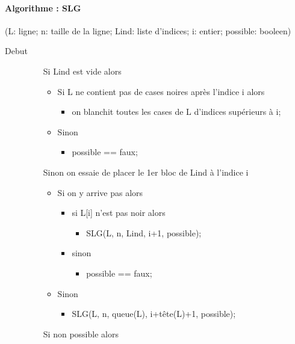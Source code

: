 \documentclass{article}
\begin{document}
\paragraph{Algorithme : SLG}(L: ligne; n: taille de la ligne; Lind: liste d'indices; i: entier; possible: booleen)
\begin{description}
\item[Debut]
\item[]
  \begin{itemize}
  \item[Si] Lind est vide alors 
    \begin{itemize}
    \item Si L ne contient pas de cases noires après l'indice i alors
      \begin{itemize}
      \item on blanchit toutes les cases de L d'indices supérieurs à i;
      \end{itemize}
    \item Sinon 
      \begin{itemize}
      \item possible == faux;
      \end{itemize}
    \end{itemize}
  \item[Sinon] on essaie de placer le 1er bloc de Lind à l'indice i
    \begin{itemize}
    \item Si on y arrive pas alors
      \begin{itemize}
      \item si L[i] n'est pas noir alors 
        \begin{itemize}
        \item SLG(L, n, Lind, i+1, possible);
        \end{itemize}
      \item sinon 
        \begin{itemize}
        \item possible == faux;
        \end{itemize}
      \end{itemize}
    \item Sinon
      \begin{itemize}
      \item SLG(L, n, queue(L), i+tête(L)+1, possible);
      \end{itemize}
    \end{itemize}
  \item[Si] non possible alors 
    \begin{itemize}

\end{itemize}
\end{itemize}
\end{description}
\end{document}
